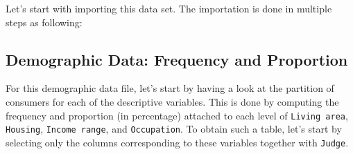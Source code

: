 \documentclass[
]{book}
\newenvironment{Shaded}{\begin{snugshade}}{\end{snugshade}}
\newcommand{\AttributeTok}[1]{\textcolor[rgb]{0.77,0.63,0.00}{#1}}
\newcommand{\DecValTok}[1]{\textcolor[rgb]{0.00,0.00,0.81}{#1}}
\newcommand{\FunctionTok}[1]{\textcolor[rgb]{0.00,0.00,0.00}{#1}}
\newcommand{\NormalTok}[1]{#1}
\newcommand{\OtherTok}[1]{\textcolor[rgb]{0.56,0.35,0.01}{#1}}
\newcommand{\SpecialCharTok}[1]{\textcolor[rgb]{0.00,0.00,0.00}{#1}}
\newcommand{\StringTok}[1]{\textcolor[rgb]{0.31,0.60,0.02}{#1}}
\begin{document}
Let's start with importing this data set. The importation is done in multiple steps as following:

\begin{Shaded}
\end{Shaded}

\hypertarget{demographic-data-frequency-and-proportion}{%
\subsection{Demographic Data: Frequency and Proportion}\label{demographic-data-frequency-and-proportion}}

For this demographic data file, let's start by having a look at the partition of consumers for each of the descriptive variables. This is done by computing the frequency and proportion (in percentage) attached to each level of \texttt{Living\ area}, \texttt{Housing}, \texttt{Income\ range}, and \texttt{Occupation}. To obtain such a table, let's start by selecting only the columns corresponding to these variables together with \texttt{Judge}.
\end{document}

